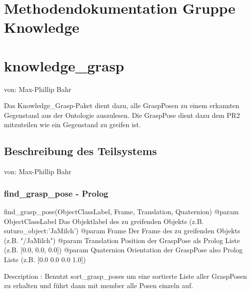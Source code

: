 \documentclass{suturo}
\makeatletter
\newcommand{\chapterauthor}[1]{%
  {\parindent0pt\vspace*{-27pt}%
  \linespread{0}\small\begin{flushright}von: #1\end{flushright}%
  \par\nobreak\vspace*{0pt}}
  \@afterheading%
}
\makeatother
\begin{document}
\newpage
\section*{Methodendokumentation Gruppe Knowledge}
\section{knowledge\_grasp}
\chapterauthor{Max-Phillip Bahr}
Das Knowledge\_Grasp-Paket dient dazu, alle GraspPosen zu einem erkannten Gegenstand aus der Ontologie auszulesen. Die GraspPose dient dazu dem PR2 mitzuteilen wie ein Gegenstand zu greifen ist.

\begin{figure}[!htb]
\end{figure}
      
\subsection{Beschreibung des Teilsystems}
\chapterauthor{Max-Phillip Bahr}

\subsubsection{find\_grasp\_pose - Prolog}
\begin{spverbatim}
find_grasp_pose(ObjectClassLabel, Frame, Translation, Quaternion)
@param ObjectClassLabel Das Objektlabel des zu greifenden Objekts 
       (z.B. suturo_object:'JaMilch')
@param Frame Der Frame des zu greifenden Objekts (z.B. "/JaMilch")
@param Translation Position der GraspPose als Prolog Liste 
       (z.B. [0.0, 0.0, 0.0])
@param Quaternion Orientation der GraspPose also Prolog Liste 
       (z.B. [0.0 0.0 0.0 1.0])

Description : Benutzt sort_grasp_poses um eine sortierte Liste aller 
GraspPosen zu erhalten und führt dann mit member alle Posen einzeln auf.
\end{spverbatim}
\end{document}
